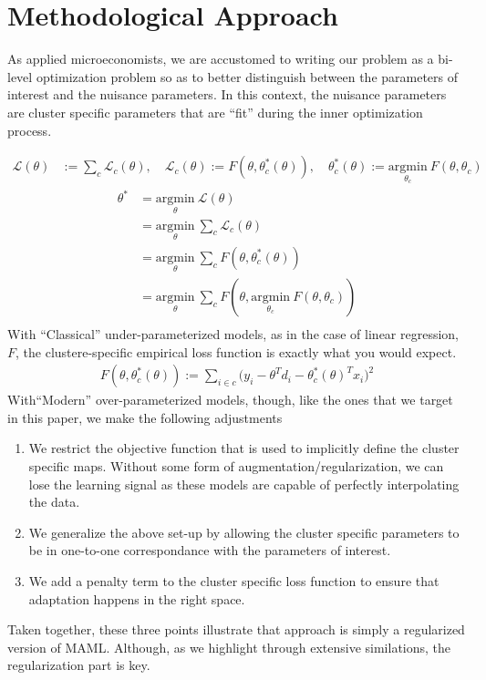 \documentclass[a4paper,12pt]{article}
\begin{document}
\section{Methodological Approach}

As applied microeconomists, we are accustomed to writing our problem as a bi-level optimization problem so as to better distinguish between the parameters of interest and the nuisance parameters. In this context, the nuisance parameters are cluster specific parameters that are ``fit'' during the inner optimization process. 
 
\begin{align*}
    \mathcal{L}(\theta) &:= \sum _c \mathcal{L}_c(\theta), \quad \mathcal{L}_c(\theta) := F(\theta, \theta^*_c(\theta)), \quad  \theta_c^*(\theta) := \underset{\theta_c}{\textrm{argmin}} \ F(\theta, \theta_c) 
\end{align*}
\begin{align*}
    \theta ^* &= \underset{\theta}{\textrm{argmin}}\ \mathcal{L}(\theta) \\ 
    &= \underset{\theta}{\textrm{argmin}}\ \sum _c \mathcal{L}_c(\theta)\\ 
    &= \underset{\theta}{\textrm{argmin}}\ \sum _c  F(\theta, \theta^*_c(\theta))\\
    &= \underset{\theta}{\textrm{argmin}}\ \sum _c  F(\theta, \underset{\theta_c}{\textrm{argmin}} \ F(\theta, \theta_c) )\\
\end{align*}
With “Classical” under-parameterized models, as in the case of linear regression, $F$, the clustere-specific empirical loss function is exactly what you would expect. 
\begin{align*}
    F(\theta, \theta_c^*(\theta)) := \sum _{i \in c}\big(y_i - \theta^Td_i - \theta _c^*(\theta)^Tx_i \big)^2
\end{align*}
 With“Modern” over-parameterized models, though, like the ones that we target in this paper, we make the following adjustments 
 \begin{enumerate}
     \item We restrict the objective function that is used to implicitly define the cluster specific maps. Without some form of augmentation/regularization, we can lose the learning signal as these models are capable of perfectly interpolating the data. 
     \item We generalize the above set-up by allowing the cluster specific parameters to be in one-to-one correspondance with the parameters of interest. 
     \item We add a penalty term to the cluster specific loss function to ensure that adaptation happens in the right space. 
 \end{enumerate}
 Taken together, these three points illustrate that approach is simply a regularized version of MAML. Although, as we highlight through extensive similations, the regularization part is key. 
 
\end{document}
